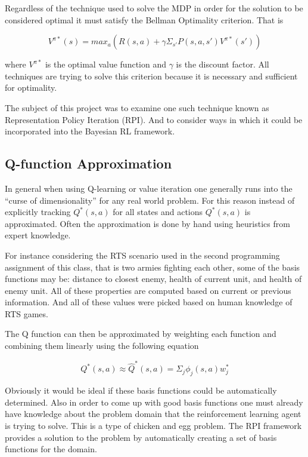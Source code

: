 \documentclass[12pt, letterpaper, final]{report}
\begin{document}
Regardless of the technique used to solve the MDP in order for the
solution to be considered optimal it must satisfy the Bellman Optimality
criterion. That is

\[
V^{\pi*} (s) = max_a ( R(s, a) + \gamma \Sigma_{s'} P(s, a, s')
V^{\pi*}(s'))
\]

where $V^{\pi*}$ is the optimal value function and $\gamma$ is the
discount factor. \cite{soumya_ray_eecs_2012} \cite{richard_s._sutton_reinforcement_2005} All techniques are trying to solve this criterion
because it is necessary and sufficient for optimality.

The subject
of this project was to examine one such technique known as
Representation Policy Iteration (RPI). And to consider ways in which
it could be incorporated into the Bayesian RL framework.

\subsection*{Q-function Approximation}

In general when using Q-learning or value iteration one generally runs
into the ``curse of dimensionality'' for any real world
problem. For this reason instead of explicitly tracking $Q^*(s,a)$ for all
states and actions $Q^*(s,a)$ is approximated. Often the approximation
is done by hand using heuristics from expert knowledge.

For instance considering the RTS scenario used in the second
programming assignment of this class, that is two armies fighting each
other, some of the basis functions may be: distance to closest enemy, health
of current unit, and health of enemy unit. All of these properties are
computed based on current or previous information. And all of these
values were picked based on human knowledge of RTS games.

The Q function can then be approximated by weighting each function and
combining them linearly using the following equation
\cite{soumya_ray_eecs_2012} \cite{richard_s._sutton_reinforcement_2005}

\[
Q^*(s,a) \approx \hat{Q}^*(s,a) = \Sigma_j \phi_j(s,a)w_j^*
\]

Obviously it would be ideal if these basis functions could be
automatically determined. Also in order to come up with good basis
functions one must already have knowledge about the problem domain
that the reinforcement learning agent is trying to solve. This is a
type of chicken and egg problem. The RPI
framework provides a solution to the problem by automatically creating
a set of basis functions for the domain.
\end{document}
